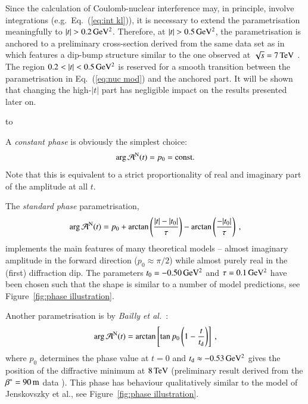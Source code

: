 Since the calculation of Coulomb-nuclear interference may, in principle, involve integrations (e.g.~Eq.~(\ref{eq:int kl})), it is necessary to extend the parametrisation meaningfully to $|t| > 0.2\,{\rm GeV^2}$. Therefore, at $|t| > 0.5\,{\rm GeV^2}$, the parametrisation is anchored to a preliminary cross-section derived from the same data set as in \cite{8tev-90m} which features a dip-bump structure similar to the one observed at $\sqrt{s} = 7\,{\rm TeV}$ \cite{epl95}. The region $0.2 < |t| < 0.5\,{\rm GeV^2}$ is reserved for a smooth transition between the parametrisation in Eq.~(\ref{eq:nuc mod}) and the anchored part. It will be shown that changing the high-$|t|$ part has negligible impact on the results presented later on.


\vskip3mm
\hbox to

A {\it constant phase} is obviously the simplest choice:
\begin{equation}
\label{eq:nuc phase con}
\arg {\cal A}^{\rm N}(t) = p_0 = \hbox{const.}
\end{equation}
Note that this is equivalent to a strict proportionality of real and imaginary part of the amplitude at all $t$.

The {\it standard phase} parametrisation,
\begin{equation}
\label{eqn:nuc phase std}
\arg {\cal A}^{\rm N}(t) = p_{0} + \arctan \left(\frac{|t|-|t_{0}|}{\tau}\right) -  \arctan \left(\frac{-|t_{0}|}{\tau}\right) \: ,
\end{equation}
implements the main features of many theoretical models -- almost imaginary amplitude in the forward direction ($p_0 \approx \pi/2$) while almost purely real in the (first) diffraction dip. The parameters $t_0 = - 0.50\,{\rm GeV^2}$ and $\tau = 0.1\,{\rm GeV^2}$ have been chosen such that the shape is similar to a number of model predictions, see Figure~\ref{fig:phase illustration}.

Another parametrisation is by {\em Bailly et al.}~\cite{bailly87}:
\begin{equation}
\label{eq:nuc phase bai}
	\arg {\cal A}^{\rm N}(t) = \arctan \left[ \tan p_0 \left(1 - {t\over t_{\rm d}} \right) \right]\ ,
\end{equation}
where $p_0$ determines the phase value at $t=0$ and $t_{\rm d} \approx -0.53\,{\rm GeV^2}$ gives the position of the diffractive minimum at $8\,{\rm TeV}$ (preliminary result derived from the $\beta^* = 90\,{\rm m}$ data \cite{8tev-90m}). This phase has behaviour qualitatively similar to the model of Jenskovszky et al., see Figure~\ref{fig:phase illustration}.

